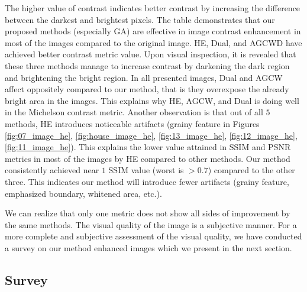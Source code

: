 The higher value of contrast indicates better contrast by increasing the difference between the darkest and brightest pixels. The table demonstrates that our proposed methods (especially GA) are effective in image contrast enhancement in most of the images compared to the original image. HE, Dual, and AGCWD have achieved better contrast metric value. Upon visual inspection, it is revealed that these three methods manage to increase contrast by darkening the dark region and brightening the bright region. In all presented images, Dual and AGCW affect oppositely compared to our method, that is they overexpose the already bright area in the images. This explains why HE, AGCW, and Dual is doing well in the Michelson contrast metric. Another observation is that out of all $5$ methods, HE introduces noticeable artifacts (grainy feature in Figures \ref{fig:07_image_he}, \ref{fig:house_image_he}, \ref{fig:13_image_he}, \ref{fig:12_image_he}, \ref{fig:11_image_he}). This explains the lower value attained in SSIM and PSNR metrics in most of the images by HE compared to other methods. Our method consistently achieved near $1$ SSIM value (worst is $>0.7$) compared to the other three. This indicates our method will introduce fewer artifacts (grainy feature, emphasized boundary, whitened area, etc.).

We can realize that only one metric does not show all sides of improvement by the same methods. The visual quality of the image is a subjective manner. For a more complete and subjective assessment of the visual quality, we have conducted a survey on our method enhanced images which we present in the next section.


\subsection{Survey}
\label{subsection:exp_result_survey}


